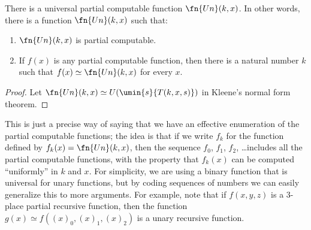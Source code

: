 \documentclass[../../../include/open-logic-section]{subfiles}
\begin{document}

\begin{thm}
There is a universal partial computable function $\fn{Un}(k,x)$. In other
words, there is a function $\fn{Un}(k,x)$ such that:
\begin{enumerate}
\item $\fn{Un}(k,x)$ is partial computable.
\item If $f(x)$ is any partial computable function, then there is a
natural number $k$ such that $f(x) \simeq \fn{Un}(k,x)$ for every $x$.
\end{enumerate}
\end{thm}

\begin{proof}
Let $\fn{Un}(k,x) \simeq U(\umin{s}{T(k,x,s)})$ in Kleene's
normal form theorem.
\end{proof}

\begin{explain}
This is just a precise way of saying that we have an effective
enumeration of the partial computable functions; the idea is that if
we write $f_k$ for the function defined by $f_k(x) = \fn{Un}(k,x)$,
then the sequence $f_0$, $f_1$, $f_2$, \dots includes all the partial
computable functions, with the property that $f_k(x)$ can be computed
``uniformly'' in $k$ and $x$. For simplicity, we are using a binary
function that is universal for unary functions, but by coding
sequences of numbers we can easily generalize this to more arguments.
For example, note that if $f(x,y,z)$ is a 3-place partial recursive
function, then the function $g(x) \simeq f((x)_0, (x)_1, (x)_2)$ is a
unary recursive function.
\end{explain}
\end{document}
